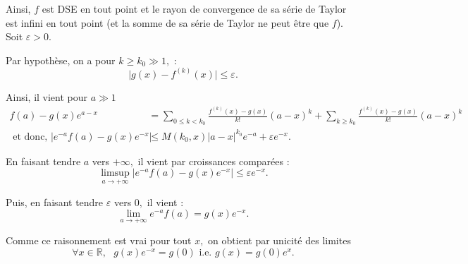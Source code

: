 Ainsi, $f$ est DSE en tout point et le rayon de convergence de sa série de Taylor est infini en tout point (et la somme de sa série de Taylor ne peut être que $f$).\\


Soit $\varepsilon>0.$

Par hypothèse, on a pour $k\geq k_{0}\gg 1,$ : $$\vert g(x)-f^{(k)}(x)\vert \leq \varepsilon.$$

Ainsi, il vient pour $a\gg 1$
\begin{align*}
f(a)-g(x)e^{a-x} & =\sum_{0\leq k< k_{0}}\frac{f^{(k)}(x)-g(x)}{k!}(a-x)^{k}+\sum_{k\geq k_{0}}\frac{f^{(k)}(x)-g(x)}{k!}(a-x)^{k}\\
\mbox{ et donc, } \vert e^{-a}f(a)-g(x)e^{-x}\vert & \leq M(k_{0},x)\vert a-x\vert^{k_{0}}e^{-a}+\varepsilon e^{-x}.
\end{align*}

En faisant tendre $a$ vers $+\infty,$ il vient par croissances comparées :  $$\limsup_{a\rightarrow +\infty}\vert e^{-a}f(a)-g(x)e^{-x}\vert\leq \varepsilon e^{-x}.$$

Puis, en faisant tendre $\varepsilon$ vers $0,$ il vient : $$\lim_{a\rightarrow +\infty} e^{-a}f(a)=g(x)e^{-x}.$$

Comme ce raisonnement est vrai pour tout $x,$ on obtient par unicité des limites $$\forall x\in \mathbb{R},\mbox{ } g(x)e^{-x}=g(0) \mbox{ i.e. } g(x)=g(0)e^{x}.$$





